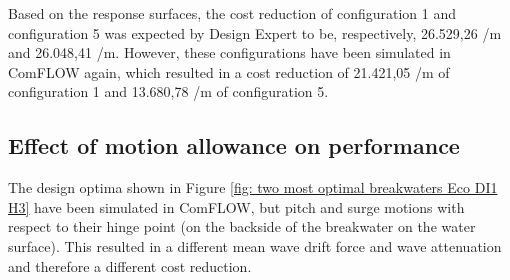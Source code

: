 Based on the response surfaces, the cost reduction of configuration 1 and configuration 5 was expected by Design Expert to be, respectively, 26.529,26 \texteuro/m and 26.048,41 \texteuro/m. However, these configurations have been simulated in ComFLOW again, which resulted in a cost reduction of 21.421,05 \texteuro/m of configuration 1 and 13.680,78 \texteuro/m of configuration 5.

\subsection{Effect of motion allowance on performance}
The design optima shown in Figure \ref{fig: two most optimal breakwaters Eco DI1 H3} have been simulated in ComFLOW, but pitch and surge motions with respect to their hinge point (on the backside of the breakwater on the water surface). This resulted in a different mean wave drift force and wave attenuation and therefore a different cost reduction. 


\begin{table}[h]
\centering
{}
\caption{Difference Performance of Moving and Captive Breakwaters}
\label{tab: difference performance moving and captive}
\end{table}


